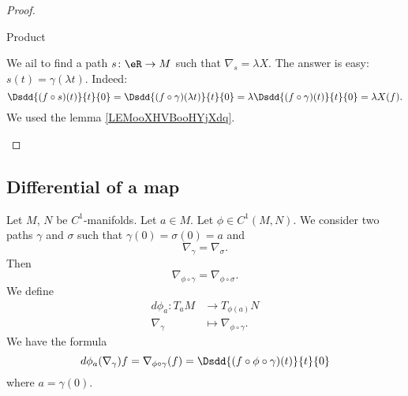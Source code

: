 \begin{proof}
\begin{subproof}
\item[Product]

        We ail to find a path \( s\colon \eR\to M\) such that \( \nabla_s=\lambda X\). The answer is easy: \( s(t)=\gamma(\lambda t)\). Indeed:
        \begin{equation}
            \Dsdd{ (f\circ s)(t) }{t}{0}=\Dsdd{ (f\circ \gamma)(\lambda t) }{t}{0}=\lambda \Dsdd{ (f\circ \gamma)(t) }{t}{0}=\lambda X(f).
        \end{equation}
        We used the lemma \ref{LEMooXHVBooHYjXdq}.
    \end{subproof}
\end{proof}

\subsection{Differential of a map}

\begin{propositionDef}
    Let \( M\), \( N\) be \( C^1\)-manifolds. Let \( a\in M\). Let \( \phi\in C^1(M,N)\). We consider two paths \( \gamma\) and \( \sigma\) such that \( \gamma(0)=\sigma(0)=a\) and
    \begin{equation}
        \nabla_{\gamma}=\nabla_{\sigma}.
    \end{equation}
    Then
    \begin{equation}
        \nabla_{\phi\circ \gamma}=\nabla_{\phi\circ \sigma}.
    \end{equation}
    We define
    \begin{equation}        \label{EQooQNZPooMVaSQC}
        \begin{aligned}
            d\phi_a\colon T_aM&\to T_{\phi(a)}N \\
            \nabla_{\gamma}&\mapsto \nabla_{\phi\circ \gamma}. 
        \end{aligned}
    \end{equation}
    We have the formula
    \begin{equation}
        d\phi_a(\nabla_{\gamma})f=\nabla_{\phi\circ \gamma}(f)=\Dsdd{ (f\circ\phi\circ\gamma)(t) }{t}{0}
    \end{equation}
    where \( a=\gamma(0)\).
\end{propositionDef}

